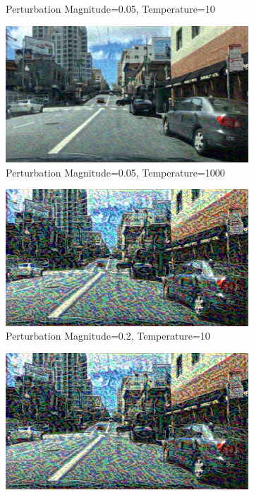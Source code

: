 \begin{figure}
\begin{subfigure}[t]{0.485\textwidth}
    		\caption{Perturbation Magnitude=0.05, Temperature=10}
    	\end{subfigure}
    	\begin{subfigure}[t]{0.485\textwidth}
    		\centering
    		\includegraphics[width=\textwidth]{images/ODIN/image_0.05_1000.png}

    		\caption{Perturbation Magnitude=0.05, Temperature=1000}
    	\end{subfigure}
        
    	\begin{subfigure}[t]{0.485\textwidth}
    		\centering
    		\includegraphics[width=\textwidth]{images/ODIN/image_0.2_10.png}

    		\caption{Perturbation Magnitude=0.2, Temperature=10}
    	\end{subfigure}
    	\begin{subfigure}[t]{0.485\textwidth}
    		\centering
    		\includegraphics[width=\textwidth]{images/ODIN/image_0.2_1000.png}


\end{subfigure}
\end{figure}

